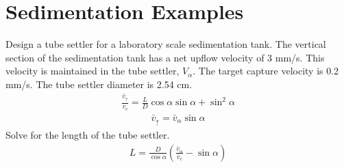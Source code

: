 \documentclass[letterpaper,10pt,english]{sphinxmanual}
\begin{document}
{\chapter{Sedimentation Examples}
\label{\detokenize{Sedimentation/Sed_Examples:sedimentation-examples}}\label{\detokenize{Sedimentation/Sed_Examples:id1}}\label{\detokenize{Sedimentation/Sed_Examples::doc}}
Design a tube settler for a laboratory scale sedimentation tank. The vertical section of the sedimentation tank has a net upflow velocity of 3 mm/s. This velocity is maintained in the tube settler, \(V_\alpha\). The target capture velocity is 0.2 mm/s. The tube settler diameter is 2.54 cm.
\begin{equation}\label{equation:Sedimentation/Sed_Examples:Sedimentation/Sed_Examples:0}
\begin{split}\frac{\bar v_{\uparrow}}{v_c} = \frac{L}{D} \cos \alpha \sin \alpha + \sin ^2 \alpha\end{split}
\end{equation}\begin{equation}\label{equation:Sedimentation/Sed_Examples:Sedimentation/Sed_Examples:1}
\begin{split}\bar v_\uparrow = \bar v_\alpha\sin \alpha\end{split}
\end{equation}
Solve for the length of the tube settler.
\begin{equation}\label{equation:Sedimentation/Sed_Examples:Sedimentation/Sed_Examples:2}
\begin{split}L = \frac{D}{\cos \alpha}\left(\frac{\bar v_\alpha}{\bar v_c} - \sin \alpha\right)\end{split}
\end{equation}
%
\begin{sphinxVerbatim}[commandchars=\\\{\}]
  
    
    
    
    

 
     


\end{sphinxVerbatim}}
\end{document}

